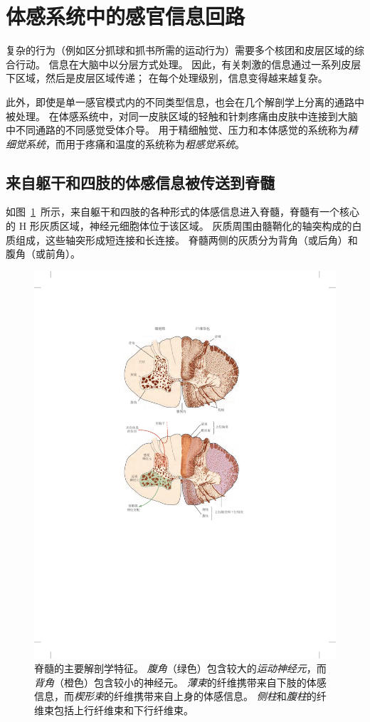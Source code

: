 \section{体感系统中的感官信息回路}

复杂的行为（例如区分抓球和抓书所需的运动行为）需要多个核团和皮层区域的综合行动。
信息在大脑中以分层方式处理。
因此，有关刺激的信息通过一系列皮层下区域，然后是皮层区域传递； 
在每个处理级别，信息变得越来越复杂。


此外，即使是单一感官模式内的不同类型信息，也会在几个解剖学上分离的通路中被处理。
在体感系统中，对同一皮肤区域的轻触和针刺疼痛由皮肤中连接到大脑中不同通路的不同感觉受体介导。
用于精细触觉、压力和本体感觉的系统称为\textit{精细觉系统}，而用于疼痛和温度的系统称为\textit{粗感觉系统}。



\subsection{来自躯干和四肢的体感信息被传送到脊髓}

如图~\ref{fig:4_3}~所示，来自躯干和四肢的各种形式的体感信息进入脊髓，脊髓有一个核心的 H 形灰质区域，神经元细胞体位于该区域。 
灰质周围由髓鞘化的轴突构成的白质组成，这些轴突形成短连接和长连接。
脊髓两侧的灰质分为背角（或后角）和腹角（或前角）。


\begin{figure}[htbp]
	\centering
	\includegraphics[width=0.7\linewidth]{chap04/fig_4_3}
	\caption{脊髓的主要解剖学特征。
		\textit{腹角}（绿色）包含较大的\textit{运动神经元}，而\textit{背角}（橙色）包含较小的神经元。
		\textit{薄束}的纤维携带来自下肢的体感信息，而\textit{楔形束}的纤维携带来自上身的体感信息。
		\textit{侧柱}和\textit{腹柱}的纤维束包括上行纤维束和下行纤维束。}
	\label{fig:4_3}
\end{figure}


